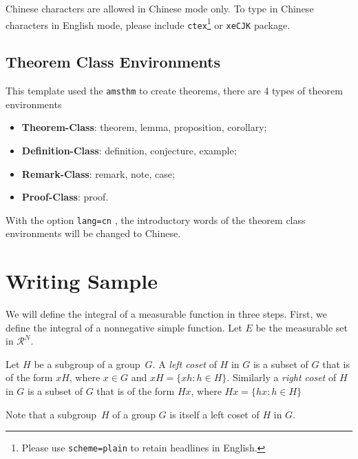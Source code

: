 \documentclass[en,hazy,device=normal,blue,14pt]{elegantnote}
\begin{document}
\begin{note}
Chinese characters are allowed in Chinese mode only. To type in Chinese characters in English mode, please include \lstinline{ctex}\footnote{Please use \lstinline{scheme=plain} to retain headlines in English.} or \lstinline{xeCJK} package.
\end{note}


\subsection{Theorem Class Environments}

This template used the \lstinline{amsthm} to create theorems, there are 4 types of theorem environments
\begin{itemize}
  \item \textbf{Theorem-Class}: theorem, lemma, proposition, corollary;
  \item \textbf{Definition-Class}: definition, conjecture, example;
  \item \textbf{Remark-Class}: remark, note, case;
  \item \textbf{Proof-Class}: proof.
\end{itemize}

\begin{remark}
With the option \lstinline{lang=cn} , the introductory words of the theorem class environments will be changed to Chinese.
\end{remark}


\section{Writing Sample}

We will define the integral of a measurable function in three steps. First, we define the integral of a nonnegative simple function. Let $E$ be the measurable set in $\mathcal{R}^N$.


\begin{definition}
Let $H$ be a subgroup of a group~$G$.  A \emph{left coset} of $H$ in $G$ is a subset of $G$ that is of the form $xH$, where $x \in G$ and $xH = \{ xh : h \in H \}$. Similarly a \emph{right coset} of $H$ in $G$ is a subset of $G$ that is of the form $Hx$, where $Hx = \{ hx : h \in H \}$
\end{definition}

Note that a subgroup~$H$ of a group $G$ is itself a left coset of $H$ in $G$.
\end{document}
